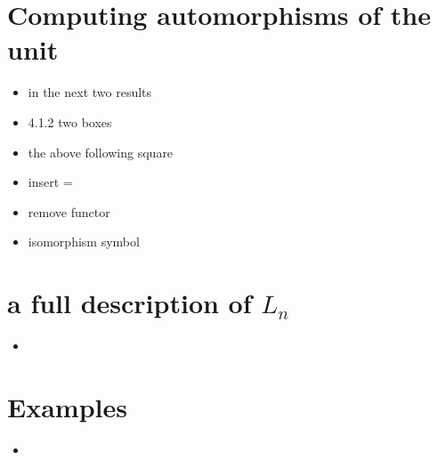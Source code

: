 \documentclass{amsart}
\begin{document}
\section{ Computing automorphisms of the unit}
\begin{itemize}
\item in the next two results
\item 4.1.2 two boxes
\item the above following square
\item insert =


\item remove functor


\item isomorphism symbol
\end{itemize}

\section{a full description of $L_n $}
\begin{itemize}
\item 
\end{itemize}
\section{ Examples}
\begin{itemize}
\item 
\end{itemize}
\end{document}
